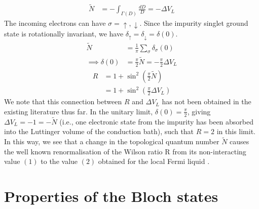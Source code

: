 \documentclass{report}
\numberwithin{equation}{section}
\begin{document}
\begin{appendices}
\begin{equation}
\begin{aligned}
\widetilde N &= -\int_{\Gamma(D)}\frac{dD}{D} = -\Delta V_L
\end{aligned}\end{equation}
The incoming electrons can have \(\sigma = \uparrow,\downarrow\).
Since the impurity singlet ground state is rotationally invariant, we have \(\delta_\uparrow = \delta_\downarrow = \delta(0)\).
\begin{equation}\begin{aligned}
\widetilde N &= \frac{1}{\pi}\sum_\sigma\delta_\sigma(0)\\
\implies \delta(0) &= \frac{\pi}{2}\widetilde N = -\frac{\pi}{2}\Delta V_L
\end{aligned}\end{equation}
\begin{equation}\begin{aligned}
\label{wilson_luttinger}
R &= 1 + \sin^2 \left(\frac{\pi}{2}\widetilde N\right)\\
  &= 1 + \sin^2 \left(\frac{\pi}{2}\Delta V_L\right)
\end{aligned}\end{equation}
We note that this connection between \(R\) and \(\Delta V_L\) has not been obtained in the existing literature thus far. In the unitary limit, \(\delta(0) = \frac{\pi}{2}\), giving \(\Delta V_L = -1 = -\tilde N\) \cite{martin1982fermi} (i.e., one electronic state from the impurity has been absorbed into the Luttinger volume of the conduction bath), such that \(R = 2\) in this limit. In this way, we see that a change in the topological quantum number \(\tilde N\) causes the well known renormalisation of the Wilson ratio R from its non-interacting value \((1)\) to the value \((2)\) obtained for the local Fermi liquid \cite{nozieres1974fermi}.

\chapter{Properties of the Bloch states}


\end{appendices}
\end{document}
